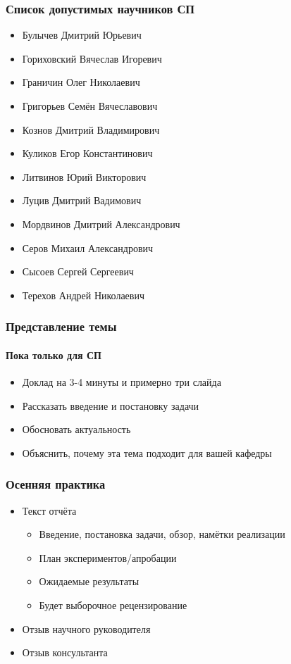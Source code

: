 \documentclass{../../slides-style}
\begin{document}
    \begin{frame}
        \frametitle{Список допустимых научников СП}
        \begin{itemize}
            \item Булычев Дмитрий Юрьевич
            \item Гориховский Вячеслав Игоревич
            \item Граничин Олег Николаевич
            \item Григорьев Семён Вячеславович
            \item Кознов Дмитрий Владимирович
            \item Куликов Егор Константинович
            \item Литвинов Юрий Викторович
            \item Луцив Дмитрий Вадимович
            \item Мордвинов Дмитрий Александрович
            \item Серов Михаил Александрович
            \item Сысоев Сергей Сергеевич
            \item Терехов Андрей Николаевич
        \end{itemize}
    \end{frame}

    \begin{frame}
        \frametitle{Представление темы}
        \framesubtitle{Пока только для СП}
        \begin{itemize}
            \item Доклад на 3-4 минуты и примерно три слайда
            \item Рассказать введение и постановку задачи
            \item Обосновать актуальность
            \item Объяснить, почему эта тема подходит для вашей кафедры
        \end{itemize}
    \end{frame}

    \begin{frame}
        \frametitle{Осенняя практика}
        \begin{itemize}
            \item Текст отчёта
            \begin{itemize}
                \item Введение, постановка задачи, обзор, намётки реализации
                \item План экспериментов/апробации
                \item Ожидаемые результаты
                \item Будет выборочное рецензирование
            \end{itemize} 
            \item Отзыв научного руководителя
            \item Отзыв консультанта
        \end{itemize}
    \end{frame}
\end{document}
